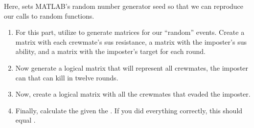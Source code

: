 \documentclass{article}
\begin{document}
Here,  sets MATLAB's random number generator seed so that we can
reproduce our calls to random functions.

\begin{enumerate}[leftmargin=*]
	\item
		For this part, utilize  to generate
		matrices for our \enquote{random} events. Create a
		 matrix with each crewmate's sus
		resistance, a  matrix with the imposter's
		sus ability, and  a  matrix with the
		imposter's target for each round.



	\item
		Now generate a logical  matrix that will
		represent all crewmates, the imposter can that can kill
		in twelve rounds.


	\item
		Now, create a logical  matrix with
		all the crewmates that evaded the imposter.

	\item
		Finally, calculate the  given the
		.  If you did everything correctly,
		this should equal .
\end{enumerate}
\end{document}
